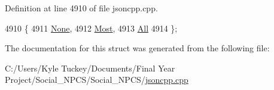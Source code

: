 Definition at line 4910 of file jsoncpp.\+cpp.


\begin{DoxyCode}
4910             \{
4911     \hyperlink{struct_json_1_1_comment_style_a51fc08f3518fd81eba12f340d19a3d0cac8b32a8bae63414c8647d4919da8d437}{None},  
4912     \hyperlink{struct_json_1_1_comment_style_a51fc08f3518fd81eba12f340d19a3d0cac65238f050773c107690a456e9c05c98}{Most},  
4913     \hyperlink{struct_json_1_1_comment_style_a51fc08f3518fd81eba12f340d19a3d0ca32302c0b97190c1808b3e38f367fef01}{All}  
4914   \};
\end{DoxyCode}


The documentation for this struct was generated from the following file\+:\begin{DoxyCompactItemize}
\item 
C\+:/\+Users/\+Kyle Tuckey/\+Documents/\+Final Year Project/\+Social\+\_\+\+N\+P\+C\+S/\+Social\+\_\+\+N\+P\+C\+S/\hyperlink{jsoncpp_8cpp}{jsoncpp.\+cpp}\end{DoxyCompactItemize}

